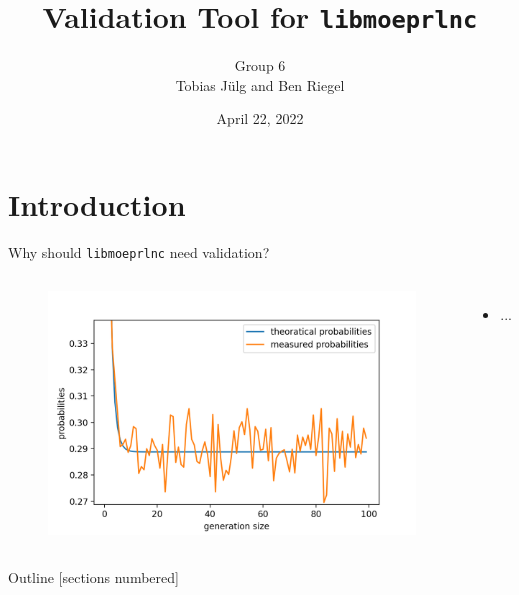 \documentclass[t]{beamer} %
\title{Validation Tool for \texttt{libmoeprlnc}}
\date{April 22, 2022}
\author{Group 6\\Tobias Jülg and Ben Riegel}
\institute[TUM]{Technical University of Munich}
\begin{document}
\maketitle


\section{Introduction}
\begin{frame}{Why should \texttt{libmoeprlnc} need validation?}
  \begin{columns}
    \begin{figure}[htb]
      \centering
      \includegraphics[scale=0.16]{figures/gf2}
    \end{figure}
  \begin{itemize}
    \item ...
  \end{itemize}
  \end{columns}
\end{frame}

\begin{frame}{Outline}
  [sections numbered]
  \tableofcontents %
\end{frame}


\end{document}
